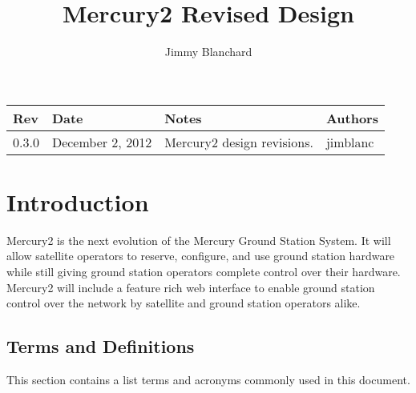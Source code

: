 \documentclass{mxl-design}
\title{Mercury2 Revised Design}
\author{Jimmy Blanchard}
\begin{document}
\maketitle

\vspace{5in}
\begin{table}[H]
\begin{center}
\begin{tabular}{|p{0.5in}|p{1.2in}|p{2.8in}|p{0.5in}|}
	\hline
	\bf Rev & \bf Date & \bf Notes & \bf Authors \\ 
	\hline
	0.3.0 & December 2, 2012 & Mercury2 design revisions. & jimblanc \\ \hline
\end{tabular}
\end{center}
\end{table}

\clearpage
\tableofcontents
\clearpage

\section{Introduction}
Mercury2 is the next evolution of the Mercury Ground Station System. It will allow satellite operators to reserve, configure, and use ground station hardware while still giving ground station operators complete control over their hardware. Mercury2 will include a feature rich web interface to enable ground station control over the network by satellite and ground station operators alike.

\subsection{Terms and Definitions}
This section contains a list terms and acronyms commonly used in this document.
\end{document}
